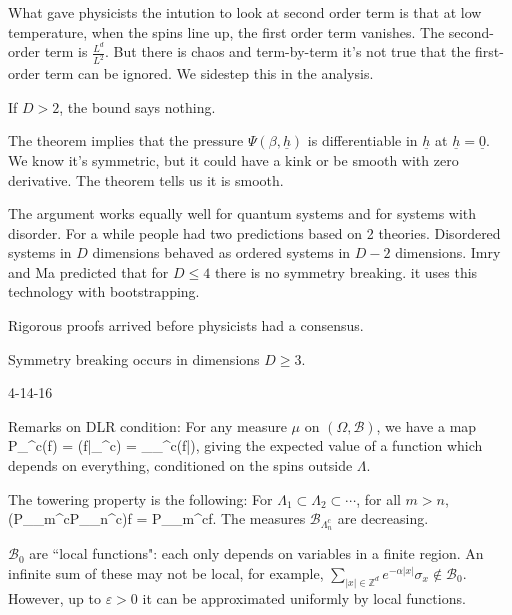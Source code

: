 \documentclass[12pt]{book}
\theoremstyle{norm}
\begin{document}
What gave physicists the intution to look at second order term is that at low temperature, when the spins line up, the first order term vanishes. The second-order term is $\frac{L^d}{L^2}$. But there is chaos and term-by-term it's not true that the first-order term can be ignored. We sidestep this in the analysis.

If $D>2$, the bound says nothing.


The theorem implies that the pressure $\Psi(\beta, \underline{h})$ is differentiable in $\underline{h}$ at $\underline{h} = \underline{0}$. We know it's symmetric, but it could have a kink or be smooth with zero derivative. The theorem tells us it is smooth.

The argument works equally well for quantum systems and for systems with disorder. For a while people had two predictions based on 2 theories. Disordered systems in $D$ dimensions behaved as ordered systems in $D-2$ dimensions. Imry and Ma predicted that for $D\le 4$ there is no symmetry breaking. it uses this technology with bootstrapping.

Rigorous proofs arrived before physicists had a consensus.
%

Symmetry breaking occurs in dimensions $D\ge 3$. %



{\color{blue}4-14-16}

Remarks on DLR condition: For any measure $\mu$ on $(\Omega, \mathcal{B})$, we have a map
\be
P_{\Lambda^c}(f) = (f|\sigma_{\Lambda^c}) = _{_{\Lambda^c}}(f|\sigma),
\ee
giving the expected value of a function which depends on everything, conditioned on the spins outside $\Lambda$.

The towering property is the following: For $\Lambda_1\subset \Lambda_2\subset\cdots$, for all $m>n$,
\be
(P_{\Lambda_m^c}P_{\Lambda_n^c})f = P_{\Lambda_m^c}f.
\ee
The measures $\mathcal{B}_{\Lambda_n^c}$ are decreasing.

$\mathcal{B}_0$ are ``local functions": each only depends on variables in a finite region. An infinite sum of these may not be local, for example, $\sum_{|x|\in \mathbb{Z}^d} e^{-\alpha|x|} \sigma_x\not\in \mathcal{B}_0$. However, up to $\varepsilon>0$ it can be approximated uniformly by local functions.
\end{document}
